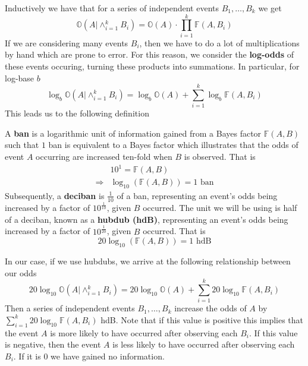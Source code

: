   \noindent Inductively we have that for a series of independent
  events $B_1, \dots, B_k$ we get
  \[
    \mathbb{O}(A|\wedge_{i=1}^k B_i) =
    \mathbb{O}(A)\cdot\prod_{i=1}^k{\mathbb{F}(A,B_i)}
  \]
  If we are considering many events $B_i$, then we have to do a lot
  of multiplications by hand which are prone to error. For this
  reason, we consider the {\bf{log-odds}} of these events occuring,
  turning these products into summations. In particular, for log-base $b$
  \[
    \log_b\mathbb{O}(A|\wedge_{i=1}^k B_i) =
    \log_b\mathbb{O}(A)+\sum_{i=1}^k{\log_b\mathbb{F}(A,B_i)}
  \]
  This leads us to the following definition
  \begin{definition}
    A {\bf{ban}} is a logarithmic unit of information gained from a
    Bayes factor $\mathbb{F}(A,B)$ such that $1$ ban is equivalent to
    a Bayes factor which illustrates that the odds of event $A$
    occurring are increased ten-fold when $B$ is observed. That is
    \begin{align*}
      & 10^1 = \mathbb{F}(A,B)                    \\
      \Rightarrow & \log_{10}(\mathbb{F}(A,B)) = 1\text{ ban}
    \end{align*}
    \noindent Subsequently, a {\bf{deciban}} is $\frac{1}{10}$ of a
    ban, representing an event's odds being increased by a factor of
    $10^\frac{1}{10}$, given $B$ occurred. The unit we will be using
    is half of a deciban, known as a {\bf{hubdub (hdB)}},
    representing an event's odds being increased by a factor of
    $10^\frac{1}{20}$, given $B$ occurred. That is
    \[
      20\log_{10}(\mathbb{F}(A,B)) = 1\text{ hdB}
    \]
  \end{definition}
  \noindent In our case, if we use hubdubs, we arrive at the
  following relationship between our odds
  \[
    20\log_{10}\mathbb{O}(A|\wedge_{i=1}^k B_i) =
    20\log_{10}\mathbb{O}(A)+\sum_{i=1}^k{20\log_{10}\mathbb{F}(A,B_i)}
  \]
  Then a series of independent events $B_1, \dots, B_k$ increase the
  odds of $A$ by  $\sum_{i=1}^k{20\log_{10}\mathbb{F}(A,B_i)}$ hdB.
  Note that if this value is positive this implies that the event $A$
  is more likely to have occurred after observing each $B_i$. If this
  value is negative, then the event $A$ is less likely to have
  occurred after observing each $B_i$. If it is $0$ we have gained no
  information.

